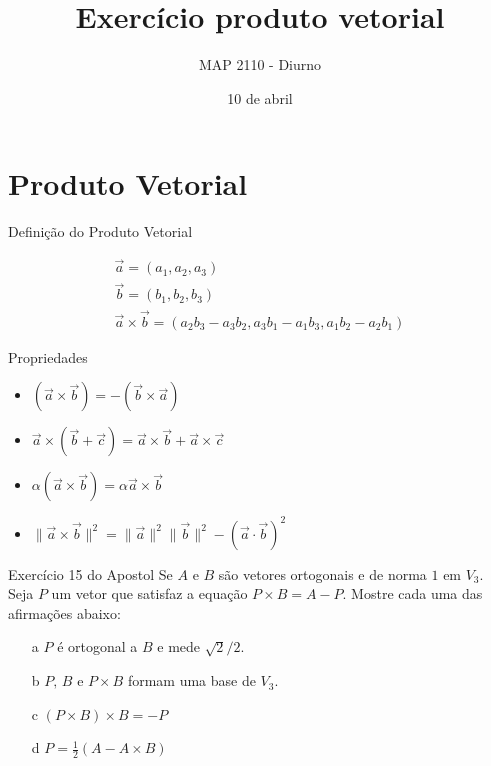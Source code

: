 \documentclass{beamer}
\title{Exercício produto vetorial}
\author{MAP 2110 - Diurno}
\institute{IME USP}
\date{10 de abril}
\begin{document}
\begin{frame}
  \titlepage
\end{frame}


\section {Produto Vetorial}

\begin{frame}{Definição do Produto Vetorial }
 
 \begin{gather*}
   \vec{a}=(a_1,a_2,a_3)\\
   \vec{b}=(b_1,b_2,b_3)\\
   \vec{a}\times \vec{b}=(a_2b_3-a_3b_2, a_3b_1-a_1b_3, a_1b_2-a_2b_1)
 \end{gather*}

\end{frame}

\begin{frame}{Propriedades}
  \begin{itemize}
    \item $(\vec{a}\times \vec{b}) = - (\vec{b}\times \vec{a})$
    \item $\vec{a}\times(\vec{b} + \vec{c})=\vec{a}\times \vec{b} + \vec{a}\times\vec{c}$
    \item $\alpha(\vec{a}\times \vec{b})=\alpha\vec{a}\times \vec{b}$
    \item $\|\vec{a}\times\vec{b}\|^2 =\|\vec{a}\|^2 \|\vec{b}\|^2 -(\vec{a}\cdot\vec{b})^2$  \end{itemize}

\end{frame}


\begin{frame}{Exercício 15 do Apostol}
  Se $A$ e $B$ são vetores ortogonais e de norma $1$ em $V_3$. Seja $P$ um vetor
  que satisfaz a equação $P\times B = A - P$. Mostre cada uma das afirmações abaixo:
  \begin{itemize}
    \item[a] $P$ é ortogonal a $B$ e mede $\sqrt{2}/2$.
    \item[b] $P\text{, }B$ e $P\times B$ formam uma base de $V_3$.
    \item[c]  $(P\times B)\times B = -P$
    \item[d]  $P= \frac{1}{2}(A-A\times B)$
  \end{itemize}
\end{frame}
\end{document}
